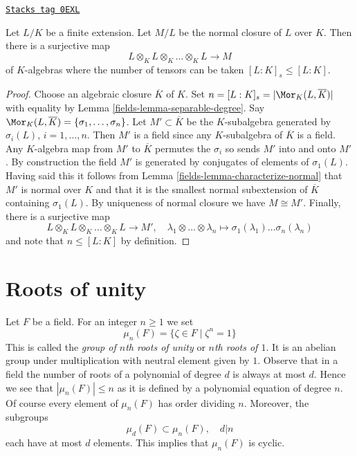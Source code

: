 \begin{lemma}
\label{fields-lemma-normal-closure-tensor-product}
\href{https://stacks.math.columbia.edu/tag/0EXL}{\texttt{Stacks tag 0EXL}}

Let $L/K$ be a finite extension. Let $M/L$ be the normal
closure of $L$ over $K$. Then there is a surjective map
$$
L \otimes_K L \otimes_K \ldots \otimes_K L \longrightarrow M
$$
of $K$-algebras where the number of tensors can be taken
$[L : K]_s \leq [L : K]$.
\end{lemma}

\begin{proof}

Choose an algebraic closure $\overline{K}$ of $K$.
Set $n = [L : K]_s = |\Mor_K(L, \overline{K})|$ with equality by
Lemma \ref{fields-lemma-separable-degree}.
Say $\Mor_K(L, \overline{K}) = \{\sigma_1, \ldots, \sigma_n\}$.
Let $M' \subset \overline{K}$ be the $K$-subalgebra
generated by $\sigma_i(L)$, $i = 1, \ldots, n$. Then $M'$ is
a field since any $K$-subalgebra of $\overline{K}$ is a field.
Any $K$-algebra map from $M'$ to $\overline{K}$ permutes the $\sigma_i$
so sends $M'$ into and onto $M'$. By construction the field $M'$
is generated by conjugates of elements of $\sigma_1(L)$. Having said
this it follows from Lemma \ref{fields-lemma-characterize-normal}
that $M'$ is normal over $K$ and that it is the
smallest normal subextension of $\overline{K}$ containing
$\sigma_1(L)$. By uniqueness of normal closure we have $M \cong M'$.
Finally, there is a surjective map
$$
L \otimes_K L \otimes_K \ldots \otimes_K L \longrightarrow M',
\quad
\lambda_1 \otimes \ldots \otimes \lambda_n \longmapsto
\sigma_1(\lambda_1) \ldots \sigma_n(\lambda_n)
$$
and note that $n \leq [L : K]$ by definition.
\end{proof}

\section{Roots of unity}
\label{fields-section-roots-of-1}
Let $F$ be a field. For an integer $n \geq 1$ we set
$$
\mu_n(F) = \{\zeta \in F \mid \zeta^n = 1\}
$$
This is called the {\it group of $n$th roots of unity} or
{\it $n$th roots of $1$}. It is an abelian group under multiplication
with neutral element given by $1$.
Observe that in a field the number of roots of a polynomial of degree $d$
is always at most $d$. Hence we see that $|\mu_n(F)| \leq n$
as it is defined by a polynomial equation of degree $n$.
Of course every element of $\mu_n(F)$ has order dividing $n$.
Moreover, the subgroups
$$
\mu_d(F) \subset \mu_n(F),\quad d | n
$$
each have at most $d$ elements. This implies that $\mu_n(F)$ is cyclic.

